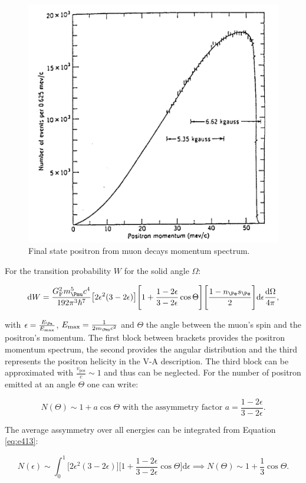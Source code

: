 \begin{figure}
\centering
\includegraphics[width=0.5\linewidth]{./fig/posangas.png}
\caption{Final state positron from muon decays momentum spectrum.}
\label{fig:angassy}
\end{figure}

For the transition probability $W$ for the solid angle $\Omega$:

\begin{equation}
\label{eq:e413}
\mathrm{d}W=\frac{G_{\text{F}}^2m_{\Pmu}^5c^4}{192\pi^3\hbar^7}\big[2\epsilon^2(3-2\epsilon) \big] \Bigg[1+\frac{1-2\epsilon}{3-2\epsilon} \cos{\Theta} \Bigg] \Bigg[ \frac{1-n_{\Pe}s_{\Pe}}{2}\Bigg]\mathrm{d}\epsilon \frac{\mathrm{d}\Omega}{4\pi},
\end{equation}

with $\epsilon = \frac{E_{\Pe}}{E_{\text{max}}}$, $E_{\text{max}} = \frac{1}{2m_{\Pmu}c^2}$ and $\Theta$ the angle between the muon's spin and the positron's momentum. The first block between brackets provides the positron momentum spectrum, the second provides the angular distribution and the third represents the positron helicity in the V-A description. The third block can be approximated with $\frac{v_{\text{pos}}}{c} \sim 1$ and thus can be neglected. For the number of positron emitted at an angle $\Theta$ one can write:

\begin{equation}
N(\Theta)\sim 1+ a\cos{\Theta} \text{ with the assymmetry factor } a=\frac{1-2\epsilon}{3-2\epsilon}.
\end{equation}

The average assymmetry over all energies can be integrated from Equation \ref{eq:e413}:

\begin{equation}
N(\epsilon) \sim \int_0^1 \big[2\epsilon^2(3-2\epsilon) \big] \Bigg[1+\frac{1-2\epsilon}{3-2\epsilon} \cos{\Theta} \Bigg] \mathrm{d}\epsilon \implies N(\Theta)\sim 1 + \frac{1}{3}\cos{\Theta}.
\end{equation}

